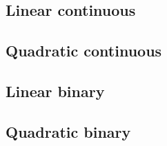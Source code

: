 \clearpage
\subsection{Linear continuous}
\begin{table}[h]
\centering\caption{Linear continuous, $n=200$, $N=2000$.}
\resizebox{\linewidth}{!}{}
\end{table}
\begin{table}[h]
\centering\caption{Linear continuous, $n=800$, $N=8000$.}
\resizebox{\linewidth}{!}{}
\end{table}
\clearpage
\subsection{Quadratic continuous}
\begin{table}[h]
\centering\caption{Quadratic continuous, $n=200$, $N=2000$.}
\resizebox{\linewidth}{!}{}
\end{table}
\begin{table}[h]
\centering\caption{Quadratic continuous, $n=800$, $N=8000$.}
\resizebox{\linewidth}{!}{}
\end{table}
\clearpage
\subsection{Linear binary}
\begin{table}[h]
\centering\caption{Linear binary, $n=200$, $N=2000$.}
\resizebox{\linewidth}{!}{}
\end{table}
\begin{table}[h]
\centering\caption{Linear binary, $n=800$, $N=8000$.}
\resizebox{\linewidth}{!}{}
\end{table}
\clearpage
\subsection{Quadratic binary}
\begin{table}[h]
\centering\caption{Quadratic binary, $n=200$, $N=2000$.}
\resizebox{\linewidth}{!}{}
\end{table}
\begin{table}[h]
\centering\caption{Quadratic binary, $n=800$, $N=8000$.}
\resizebox{\linewidth}{!}{}
\end{table}
\clearpage
